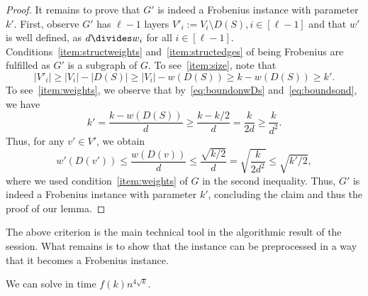 \begin{proof}
%
It remains to prove that $G'$ is indeed a Frobenius instance with parameter $k'$. First, observe $G'$ has $\ell-1$ layers $V'_i := V_i \setminus D(S), i\in [\ell-1]$ and that $w'$ is well defined, as $d\divides w_i$ for all $i\in [\ell-1]$. Conditions~\ref{item:structweights} and~\ref{item:structedges} of being Frobenius are fulfilled as $G'$ is a subgraph of $G$. To see~\ref{item:size}, note that 
\[ |V'_i| \ge |V_i| - |D(S)| \ge |V_i|- w(D(S)) \ge k-w(D(S)) \ge k'. \]
To see~\ref{item:weights}, we observe that by~\eqref{eq:boundonwDs} and~\eqref{eq:boundsond}, we have
\[ k' = \frac{k-w(D(S))}{d} \ge \frac{k-k/2}{d} = \frac{k}{2d} \ge \frac{k}{d^2}. \]
Thus, for any $v'\in V'$, we obtain
\[ w'(D(v')) \le \frac{w(D(v))}{d} \le \frac{\sqrt{k/2}}{d} = \sqrt{\frac{k}{2d^2}} \le \sqrt{k'/2}, \]
where we used condition~\ref{item:weights} of $G$ in the second inequality. Thus, $G'$ is indeed a Frobenius instance with parameter $k'$, concluding the claim and thus the proof of our lemma.
\end{proof}
%
%
The above criterion is the main technical tool in the algorithmic result of the session. What remains is to show that the instance can be preprocessed in a way that it becomes a Frobenius instance.
\begin{thm}\label{thm:implalgo}
We can solve \wDAGImplication in time $f(k)n^{4\sqrt{k}}$.
\end{thm}
